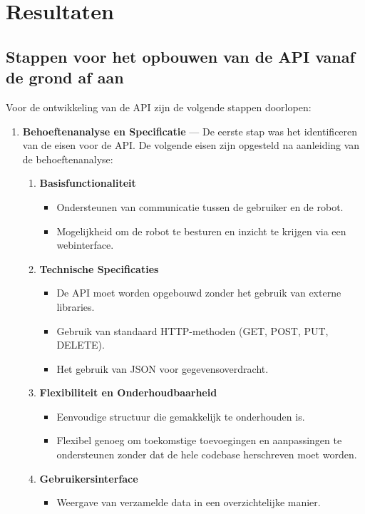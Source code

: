 \section{Resultaten}
\label{sec:resultaten}

\subsection{Stappen voor het opbouwen van de API vanaf de grond af aan}
Voor de ontwikkeling van de API zijn de volgende stappen doorlopen:
\begin{enumerate}
  \item \textbf{Behoeftenanalyse en Specificatie} --- De eerste stap was het
  identificeren van de eisen voor de API. De volgende eisen zijn opgesteld na
  aanleiding van de behoeftenanalyse:
  \begin{enumerate}
    \item \textbf{Basisfunctionaliteit}
    \begin{itemize}
      \item Ondersteunen van communicatie tussen de gebruiker en de robot.
      \item Mogelijkheid om de robot te besturen en inzicht te krijgen via een
      webinterface.
    \end{itemize}
    \item \textbf{Technische Specificaties}
    \begin{itemize}
      \item De API moet worden opgebouwd zonder het gebruik van externe libraries.
      \item Gebruik van standaard HTTP-methoden (GET, POST, PUT, DELETE).
      \item Het gebruik van JSON voor gegevensoverdracht.
    \end{itemize}
    \item \textbf{Flexibiliteit en Onderhoudbaarheid}
    \begin{itemize}
      \item Eenvoudige structuur die gemakkelijk te onderhouden is.
      \item Flexibel genoeg om toekomstige toevoegingen en aanpassingen te
      ondersteunen zonder dat de hele codebase herschreven moet worden.
    \end{itemize}
    \item \textbf{Gebruikersinterface}
    \begin{itemize}
      \item Weergave van verzamelde data in een overzichtelijke manier.

\end{itemize}
\end{enumerate}
\end{enumerate}
